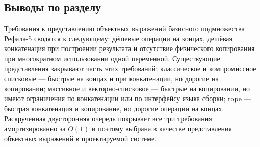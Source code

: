 \subsection{Выводы по разделу}

Требования к представлению объектных выражений базисного подмножества
Рефала-5 сводятся к следующему: дёшевые операции на концах, дешёвая
конкатенация при построении результата и отсутствие физического
копирования при многократном использовании одной переменной. Существующие
представления закрывают часть этих требований: классическое и
компромиссное списковые --- быстрые на концах и при конкатенации, но
дорогие на копировании; массивное и векторно-списковое --- быстрые на
копировании, но имеют ограничения по конкатенации или по интерфейсу
языка сборки; rope --- быстрая конкатенация и копирование, но дорогие
операции на концах. Раскрученная двусторонняя очередь покрывает все три
требования амортизированно за \(O(1)\) и поэтому выбрана в качестве
представления объектных выражений в проектируемой системе.
